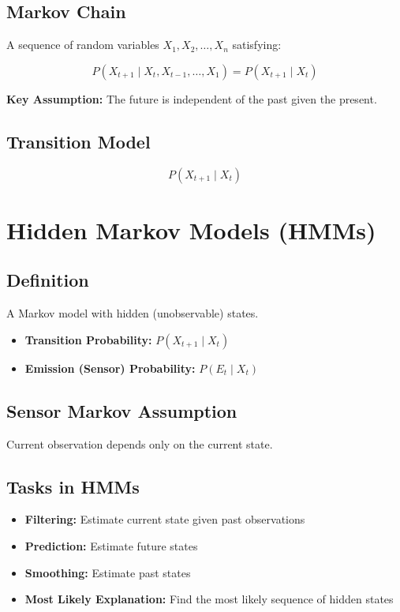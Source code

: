 \subsection*{Markov Chain}
A sequence of random variables \( X_1, X_2, \dots, X_n \) satisfying:

\[
P(X_{t+1} \mid X_t, X_{t-1}, \dots, X_1) = P(X_{t+1} \mid X_t)
\]

\textbf{Key Assumption:} The future is independent of the past given the present.

\subsection*{Transition Model}
\[
P(X_{t+1} \mid X_t)
\]

\begin{center}
\end{center}


\section{Hidden Markov Models (HMMs)}

\subsection*{Definition}
A Markov model with hidden (unobservable) states.

\begin{itemize}
    \item \textbf{Transition Probability:} \( P(X_{t+1} \mid X_t) \)
    \item \textbf{Emission (Sensor) Probability:} \( P(E_t \mid X_t) \)
\end{itemize}

\subsection*{Sensor Markov Assumption}
Current observation depends only on the current state.

\subsection*{Tasks in HMMs}
\begin{itemize}
    \item \textbf{Filtering:} Estimate current state given past observations
    \item \textbf{Prediction:} Estimate future states
    \item \textbf{Smoothing:} Estimate past states
    \item \textbf{Most Likely Explanation:} Find the most likely sequence of hidden states
\end{itemize}

